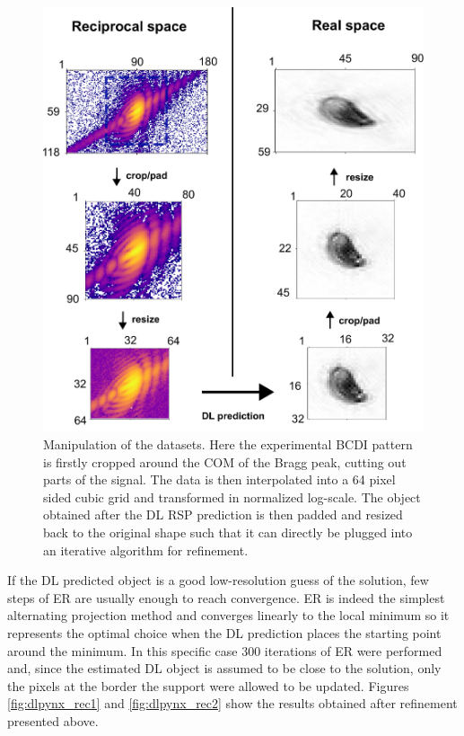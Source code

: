 \begin{figure}[H]
    \centering
    \includegraphics[width=\textwidth]{figures/Phasing/resizing.pdf}
    \caption{Manipulation of the datasets. Here the experimental BCDI pattern is firstly cropped around the COM of the Bragg peak, 
    cutting out parts of the signal. The data is then interpolated into a 64 pixel sided cubic grid and transformed in normalized 
    log-scale. The object obtained after the DL RSP prediction is then padded and resized back to the original shape such that it 
    can directly be plugged into an iterative algorithm for refinement. }
    \label{fig:resizing}
\end{figure}

If the DL predicted object is a good low-resolution guess of the solution, few steps of ER are usually enough to reach 
convergence. ER is indeed the simplest alternating projection method and converges linearly to the local minimum \cite{marchesini_unified_2007} so
it represents the optimal choice when the DL prediction places the starting point around the minimum. In this specific case 
300 iterations of ER were performed and, since the estimated DL object is assumed to be close to the solution, only the pixels at the border the support were allowed 
to be updated. Figures \ref{fig:dlpynx_rec1} and \ref{fig:dlpynx_rec2} show the results obtained after refinement 
presented above. 

